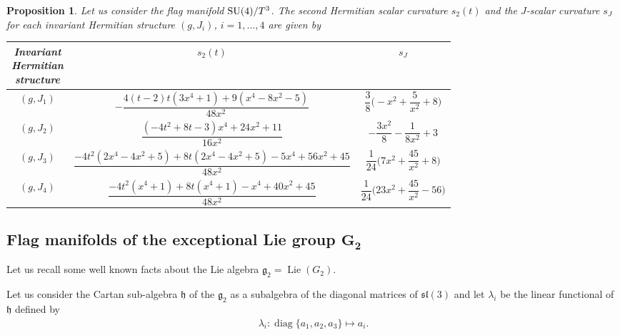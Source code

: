 \documentclass[pdftex]{sigma}%
\numberwithin{equation}{section}
\newtheorem{Proposition}[Theorem]{Proposition}
 { \theoremstyle{definition}
\newtheorem{Definition}[Theorem]{Definition}
\newtheorem{Question}[Theorem]{Question}
\newtheorem*{Notation}{Notation}
\newtheorem{Example}[Theorem]{Example}
\newtheorem{Remark}[Theorem]{Remark} }
\DeclareMathOperator{\Lie}{Lie}
\DeclareMathOperator{\Diag}{diag}
\begin{document}
\begin{Proposition}
Let us consider the flag manifold ${\rm SU}(4)/T^3$. The second Hermitian scalar curvature $s_2(t)$ and the $J$-scalar curvature $s_J$ for each invariant Hermitian structure $(g,J_i)$, $i=1,\ldots, 4$ are given by
\begin{table}[h] \setlength{\tabcolsep}{2.5pt}
\renewcommand{\arraystretch}{2.2}
\centering
\begin{tabular}{c|c|c}
\hline
\parbox[][][c]{18mm}{\vspace{1mm}\centering Invariant\\ Hermitian\\ structure\vspace{1mm}}& $s_2(t)$ & $s_J$
\\
\hline
$(g, J_1)$ & $-\dfrac{4 (t-2) t (3 x^4+1)+9 (x^4-8 x^2-5)}{48 x^2}$ & $\dfrac{3}{8} \bigg({-}x^2+\dfrac{5}{x^2}+8\bigg)$
\\
\hline
$(g, J_2)$ & $\dfrac{(-4 t^2+8 t-3) x^4+24 x^2+11}{16 x^2}$ & $-\dfrac{3 x^2}{8}-\dfrac{1}{8 x^2}+3$
\\
\hline
$(g, J_3)$ & $\dfrac{-4 t^2 (2 x^4\!-4 x^2\!+5)+8 t (2 x^4\!-4 x^2\!+5)-5 x^4+56 x^2+45}{48 x^2}$ & $\dfrac{1}{24} \bigg(7 x^2+\dfrac{45}{x^2}+8\bigg)$
\\
\hline
$(g, J_4)$ & $ \dfrac{-4 t^2 (x^4+1)+8 t (x^4+1)-x^4+40 x^2+45}{48 x^2}$ & $\dfrac{1}{24} \bigg(23 x^2+\dfrac{45}{x^2}-56\bigg)$
\\
\hline
\end{tabular}
\end{table}
\end{Proposition}

\subsection[Flag manifolds of the exceptional Lie group  \protect{$G\textunderscore{}2$}]
{Flag manifolds of the exceptional Lie group $\boldsymbol{G_{2}}$}

Let us recall some well known facts about the Lie algebra $\mathfrak{g}_{2}=\Lie(G_2)$.

Let us consider the Cartan sub-algebra $\mathfrak{h}$ of the $\mathfrak{g_{2}}$ as a subalgebra of the diagonal matrices of $\mathfrak{sl}(3)$ and let $\lambda_{i}$ be the linear functional of $\mathfrak{h}$ defined by
\begin{gather*}
\lambda_{i}\colon  \Diag\{a_{1},a_{2},a_{3}\}\longmapsto a_{i}.
\end{gather*}
\end{document}
